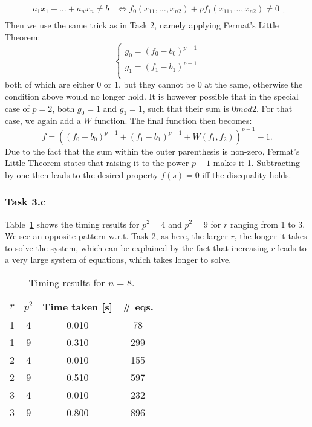 \documentclass{article}
\begin{document}
\begin{equation}
  \begin{split}
    a_1 x_1 + \dots + a_n x_n \neq b &\Leftrightarrow f_0(x_{11}, 
    \dots, x_{n 2}) + p f_1(x_{11}, 
    \dots, x_{n 2}) 
    \neq 0 \\
  \end{split}.
\end{equation} 
Then we use the same trick as in Task 2, namely applying Fermat's Little
Theorem:
\begin{equation}
\begin{cases}
  g_0 = (f_0 - b_0)^{p - 1} \\
  g_1 = (f_1 - b_1)^{p - 1} \\
\end{cases}
\end{equation} 
both of which are either $0$ or $1$, but they cannot be 0 at the same, otherwise
the condition above would no longer hold. It is however possible that in the
special case of $p = 2$, both $g_0 = 1$ and $g_1 = 1$, such that their sum is $0
mod 2$. For that case, we again add a $W$ function. The final function then
becomes:
\begin{equation}
  f = \left( (f_0 - b_0)^{p - 1} + (f_1 - b_1)^{p-1} + W(f_1, f_2)
  \right)^{p-1} - 1.
\end{equation} 
Due to the fact that the sum within the outer parenthesis is non-zero, Fermat's
Little Theorem states that raising it to the power $p - 1$ makes it 1.
Subtracting by one then leads to the desired property  $f(s) = 0$ iff the
disequality holds.

\subsubsection*{Task 3.c}

Table~\ref{tab:timing_results_3c} shows the timing results for $p^2 = 4$ and
$p^2 = 9$ for $r$ ranging from 1 to 3. We see an opposite pattern w.r.t. Task 2,
as here, the larger $r$, the longer it takes to solve the system, which can be
explained by the fact that increasing $r$ leads to a very large system of
equations, which takes longer to solve.

\begin{table}[htpb]
  \centering
  \caption{Timing results for $n = 8$.}
  \label{tab:timing_results_3c}
  \begin{tabular}{cccc}
  
    \toprule
    $r$ & $p^2$ & Time taken [s]  & \# eqs.\\
    \midrule
    1 & 4 & 0.010 & 78\\
    \midrule
    1 & 9 & 0.310 & 299\\
    \midrule
    2 & 4 & 0.010 & 155 \\
    \midrule
    2 & 9 & 0.510 & 597 \\
    \midrule
    3 & 4 & 0.010 & 232 \\
    \midrule
    3 & 9 & 0.800 & 896 \\
    \bottomrule
  \end{tabular}
\end{table}
\end{document}
